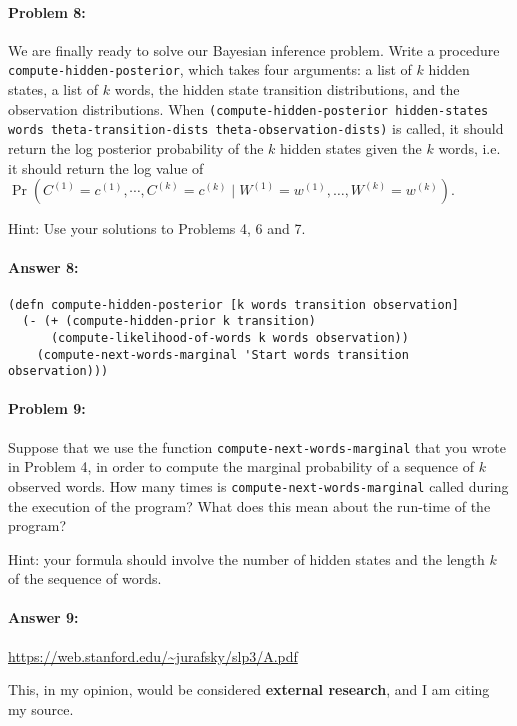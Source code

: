 \documentclass[12pt, letterpaper]{article}
\begin{document}
\paragraph{Problem 8:}
We are finally ready to solve our Bayesian inference problem. Write a
procedure \texttt{compute-hidden-posterior}, which takes four
arguments: a list of $k$ hidden states, a list of $k$ words, the
hidden state transition distributions, and the observation
distributions. When \texttt{(compute-hidden-posterior hidden-states
  words theta-transition-dists theta-observation-dists)} is called, it
should return the log posterior probability of the $k$ hidden states
given the $k$ words, i.e. it should return the log value of
$\Pr(C^{(1)}=c^{(1)},\cdots,C^{(k)}=c^{(k)} \mid
W^{(1)}=w^{(1)},\dots,W^{(k)}=w^{(k)} )$.

\noindent Hint: Use your solutions to Problems 4, 6 and 7.


\paragraph{Answer 8:}\begin{lstlisting}
(defn compute-hidden-posterior [k words transition observation]
  (- (+ (compute-hidden-prior k transition) 
      (compute-likelihood-of-words k words observation))
    (compute-next-words-marginal 'Start words transition observation)))
\end{lstlisting}

\hrulefill
\paragraph{Problem 9:}
Suppose that we use the function \texttt{compute-next-words-marginal}
that you wrote in Problem 4, in order to compute the marginal
probability of a sequence of $k$ observed words. How many times is
\texttt{compute-next-words-marginal} called during the execution of the
program? What does this mean about the run-time of the program?

\noindent Hint: your formula should involve the number of hidden
states and the length $k$ of the sequence of words.

\paragraph{Answer 9:}
\url{https://web.stanford.edu/~jurafsky/slp3/A.pdf}

This, in my opinion, would be considered \textbf{external research}, and I am citing my source.
\end{document}
